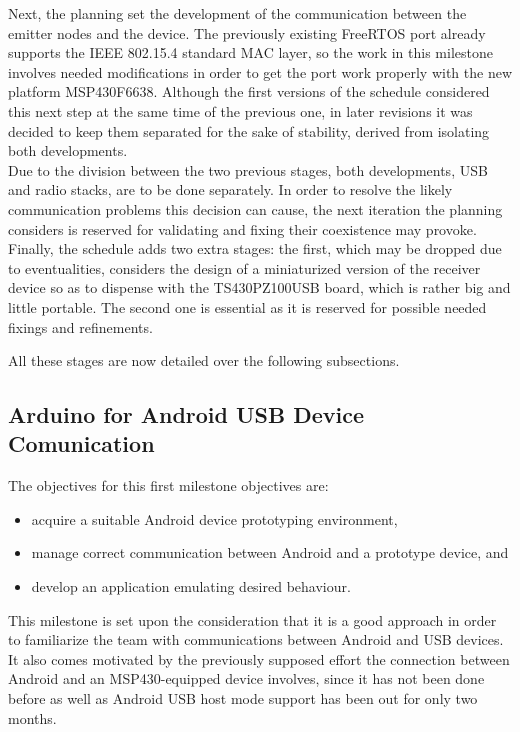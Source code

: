 	Next, the planning set the development of the communication between the emitter nodes and the device.
	The previously existing FreeRTOS port already supports the IEEE 802.15.4 standard MAC layer, so the
	work in this milestone involves needed modifications in order to get the port work properly with
	the new platform MSP430F6638. Although the first versions of the schedule considered this next step 
	at the same time of the previous one, in later revisions it was decided to keep them separated for 
	the sake of stability, derived from isolating both developments.\\
	
	Due to the division between the two previous stages, both developments, USB and radio stacks, are
	to be done separately. In order to resolve the likely communication problems this decision can cause,
	the next iteration the planning considers is reserved for validating and fixing their coexistence
	may provoke.\\
	
	Finally, the schedule adds two extra stages: the first, which may be dropped due to eventualities,
	considers the design of a miniaturized version of the receiver device so as to dispense with the
	TS430PZ100USB board, which is rather big and little portable. The second one is essential as it
	is reserved for possible needed fixings and refinements.\\
	
	All these stages are now detailed over the following subsections.\\

	\subsection{Arduino for Android USB Device Comunication}
	\label{ssec:Arduino.USB}
		The objectives for this first milestone objectives are:
		\begin{itemize}
			\item acquire a suitable Android device prototyping environment, 
			\item manage correct communication between Android and a prototype device, and
			\item develop an application emulating desired behaviour.
		\end{itemize}
			
		This milestone is set upon the consideration that it is a good approach in order to familiarize
		the team with communications between Android and USB devices. It also comes motivated by the
		previously supposed effort the connection between Android and an MSP430-equipped device involves,
		since it has not been done before as well as Android USB host mode support has been out for only
		two months.\\

